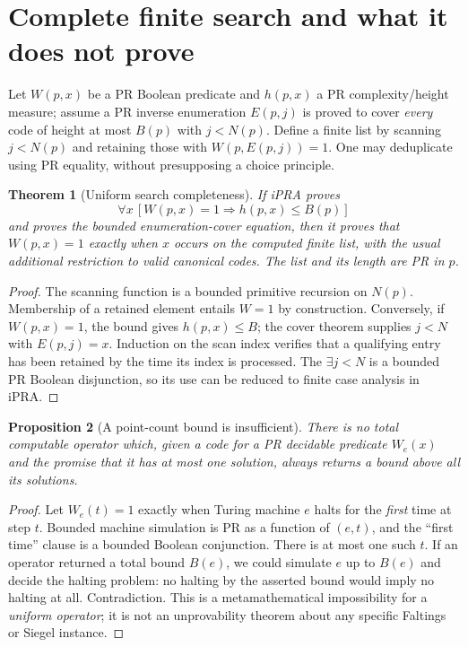 \documentclass[11pt]{article}
\newtheorem{theorem}{Theorem}[section]\newtheorem{lemma}[theorem]{Lemma}\newtheorem{proposition}[theorem]{Proposition}\newtheorem{corollary}[theorem]{Corollary}\newtheorem{definition}[theorem]{Definition}\newtheorem{remark}[theorem]{Remark}
\begin{document}
\section{Complete finite search and what it does not prove}
Let \(W(p,x)\) be a PR Boolean predicate and \(h(p,x)\) a PR complexity/height measure; assume a PR inverse enumeration \(E(p,j)\) is proved to cover \emph{every} code of height at most \(B(p)\) with \(j<N(p)\). Define a finite list by scanning \(j<N(p)\) and retaining those with \(W(p,E(p,j))=1\). One may deduplicate using PR equality, without presupposing a choice principle.
\begin{theorem}[Uniform search completeness]\label{thm:search}
If iPRA proves
\[\forall x\,[W(p,x)=1\Rightarrow h(p,x)\le B(p)]\]
and proves the bounded enumeration-cover equation, then it proves that \(W(p,x)=1\) exactly when \(x\) occurs on the computed finite list, with the usual additional restriction to valid canonical codes. The list and its length are PR in \(p\).
\end{theorem}
\begin{proof}The scanning function is a bounded primitive recursion on \(N(p)\). Membership of a retained element entails \(W=1\) by construction. Conversely, if \(W(p,x)=1\), the bound gives \(h(p,x)\le B\); the cover theorem supplies \(j<N\) with \(E(p,j)=x\). Induction on the scan index verifies that a qualifying entry has been retained by the time its index is processed. The \(\exists j<N\) is a bounded PR Boolean disjunction, so its use can be reduced to finite case analysis in iPRA.\end{proof}
\begin{proposition}[A point-count bound is insufficient]\label{prop:count}
There is no total computable operator which, given a code for a PR decidable predicate \(W_e(x)\) and the promise that it has at most one solution, always returns a bound above all its solutions.
\end{proposition}
\begin{proof}Let \(W_e(t)=1\) exactly when Turing machine \(e\) halts for the \emph{first} time at step \(t\). Bounded machine simulation is PR as a function of \((e,t)\), and the ``first time'' clause is a bounded Boolean conjunction. There is at most one such \(t\). If an operator returned a total bound \(B(e)\), we could simulate \(e\) up to \(B(e)\) and decide the halting problem: no halting by the asserted bound would imply no halting at all. Contradiction. This is a metamathematical impossibility for a \emph{uniform operator}; it is not an unprovability theorem about any specific Faltings or Siegel instance.\end{proof}
\end{document}
